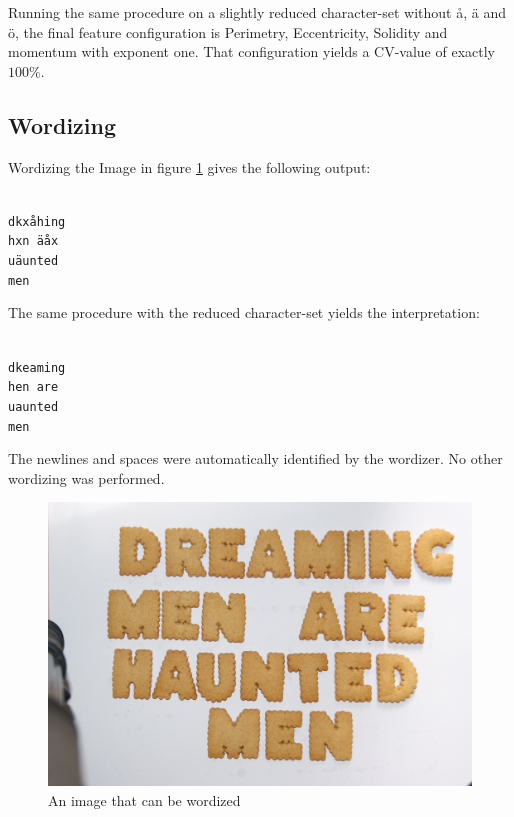 \documentclass[a4paper,11pt]{article}
\begin{document}
Running the same procedure on a slightly reduced character-set without å, ä and ö,
the final feature configuration is Perimetry, Eccentricity, Solidity and momentum with exponent one.
That configuration yields a CV-value of exactly $100\%$. 

\subsection{Wordizing}
Wordizing the Image in figure \ref{fig:dreaming} gives the following output:

\texttt{ \\
dkxåhing \\
hxn äåx \\
uäunted \\
men \\
}

The same procedure with the reduced character-set yields the interpretation:

\texttt{ \\
dkeaming \\
hen are \\
uaunted \\
men \\
}

The newlines and spaces were automatically identified by the wordizer.
No other wordizing was performed.

\begin{figure}[]
\begin{center}
\includegraphics[width=140mm]{dreaming.JPG}
\end{center}
\caption{An image that can be wordized}
\label{fig:dreaming}
\end{figure}
\end{document}
